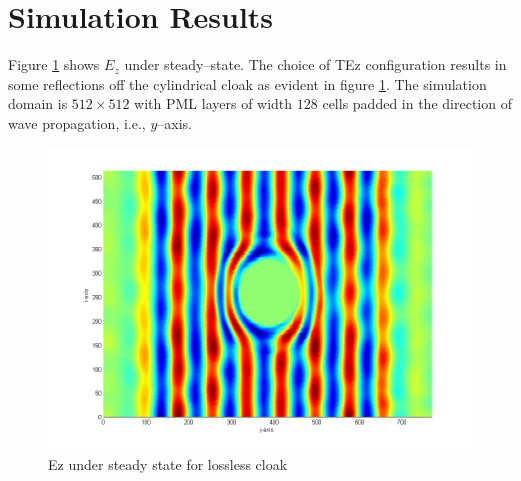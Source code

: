 \section{Simulation Results}
Figure \ref{fig:Ez-Cloak-SteadyStateLossless} shows $E_z$ under steady--state. The choice of TEz configuration results in some reflections off the cylindrical cloak as evident in figure \ref{fig:Ez-Cloak-SteadyStateLossless}. The simulation domain is $512\times 512$ with PML layers of width $128$ cells padded in the direction of wave propagation, i.e., $y$--axis.
\begin{figure}[H]
\centering
\includegraphics[scale=0.4]{Figures/FigCh05_Ez_Cloak_SteadyStateLossless.png}
\caption{Ez under steady state for lossless cloak}
\label{fig:Ez-Cloak-SteadyStateLossless}
\end{figure}